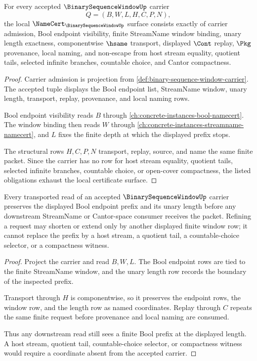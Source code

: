 \begin{theorem}
\label{thm:binary-sequence-window-namecert-obligations}
For every accepted $\BinarySequenceWindowUp$ carrier
$$
Q=(B,W,L,H,C,P,N),
$$
the local $\NameCert_{\BinarySequenceWindowUp}$ surface consists exactly of carrier admission, Bool endpoint visibility, finite StreamName window binding, unary length exactness, componentwise $\hsame$ transport, displayed $\Cont$ replay, $\Pkg$ provenance, local naming, and non-escape from host stream equality, quotient tails, selected infinite branches, countable choice, and Cantor compactness.
\end{theorem}
\begin{proof}
Carrier admission is projection from \autoref{def:binary-sequence-window-carrier}. The accepted tuple displays the Bool endpoint list, StreamName window, unary length, transport, replay, provenance, and local naming rows.

Bool endpoint visibility reads $B$ through \autoref{ch:concrete-instances-bool-namecert}. The window binding then reads $W$ through \autoref{ch:concrete-instances-streamname-namecert}, and $L$ fixes the finite depth at which the displayed prefix stops.

The structural rows $H,C,P,N$ transport, replay, source, and name the same finite packet. Since the carrier has no row for host stream equality, quotient tails, selected infinite branches, countable choice, or open-cover compactness, the listed obligations exhaust the local certificate surface.
\end{proof}

\begin{theorem}
\label{thm:binary-sequence-window-prefix-stability}
Every transported read of an accepted $\BinarySequenceWindowUp$ carrier preserves the displayed Bool endpoint prefix and its unary length before any downstream StreamName or Cantor-space consumer receives the packet. Refining a request may shorten or extend only by another displayed finite window row; it cannot replace the prefix by a host stream, a quotient tail, a countable-choice selector, or a compactness witness.
\end{theorem}
\begin{proof}
Project the carrier and read $B,W,L$. The Bool endpoint rows are tied to the finite StreamName window, and the unary length row records the boundary of the inspected prefix.

Transport through $H$ is componentwise, so it preserves the endpoint rows, the window row, and the length row as named coordinates. Replay through $C$ repeats the same finite request before provenance and local naming are consumed.

Thus any downstream read still sees a finite Bool prefix at the displayed length. A host stream, quotient tail, countable-choice selector, or compactness witness would require a coordinate absent from the accepted carrier.
\end{proof}

